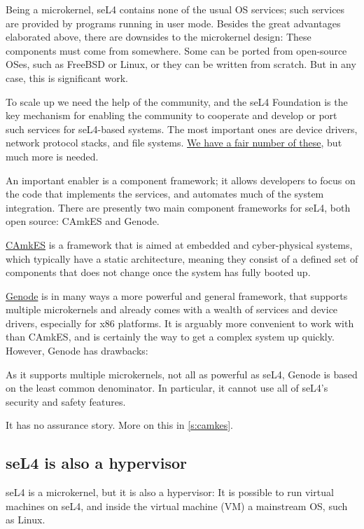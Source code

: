 \documentclass[english,a4paper,12pt\ifDraft,draft\fi]{report}
\newcommand{\SSect}[1]{\subsection{#1}}
\newcommand{\SSect}[1]{\section{#1}}
\begin{document}
  Being a microkernel, seL4 contains none of the usual OS
  services; such services are  provided by  programs running in user
  mode. Besides the great advantages elaborated above,
  there are downsides to the microkernel design:  These components
  must come from somewhere. Some can be ported from open-source OSes, such as
  FreeBSD or Linux, or they can be written from scratch. But in any
  case, this is significant work.

  To scale up we need the help of the community, and the seL4
  Foundation is the key mechanism for enabling the community to
  cooperate and develop or port such services for seL4-based
  systems. The most important ones are device drivers, network
  protocol stacks, and file
  systems. \href{https://docs.sel4.systems/projects/available-user-components.html}{We
    have a fair number of these}, but much  more is needed.

  An important enabler is a component framework; it allows developers
  to focus on the code that implements the services, and automates
  much of the system integration. There are presently two main
  component frameworks for seL4, both open source: CAmkES and Genode.

  \href{https://trustworthy.systems/projects/TS/camkes/}{CAmkES} is a
  framework that is aimed at embedded and cyber-physical systems,
  which typically have a static architecture, meaning they consist of
  a defined set of components that does not change once the system has
  fully booted up.

  \href{https://genode.org/}{Genode} is in many ways a more powerful
  and general framework, that supports multiple microkernels and
  already comes with a wealth of services and device drivers,
  especially for x86 platforms. It is arguably more convenient
  to work with than CAmkES, and is certainly the way to get a
  complex system up quickly. However, Genode has drawbacks:
  \begin{inparaenum}
  \item As it supports multiple microkernels, not all as powerful as
    seL4, Genode is based on the least common denominator. In
    particular, it cannot use all of seL4's security and safety
    features.
  \item It has no assurance story. More on this in \autoref{s:camkes}.
  \end{inparaenum}

  \SSect{seL4 is also a hypervisor}\label{s:hyp}

  seL4 is a microkernel, but it is also a hypervisor: It is possible
  to run virtual machines on seL4, and inside the virtual machine (VM)
  a mainstream OS, such as Linux.
\end{document}

